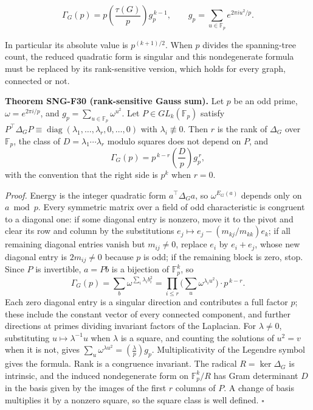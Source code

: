 \documentclass[
  11pt,
  a4paper,
]{report}
\begin{document}
\[
\Gamma_G(p)=p\left(\frac{\tau(G)}p\right)g_p^{\,k-1},
\qquad
g_p=\sum_{u\in\mathbb F_p}e^{2\pi i u^2/p}.
\tag{SNG-I022}
\]

In particular its absolute value is \(p^{(k+1)/2}\). When \(p\) divides
the spanning-tree count, the reduced quadratic form is singular and this
nondegenerate formula must be replaced by its rank-sensitive version,
which holds for every graph, connected or not.

\textbf{Theorem SNG-F30 (rank-sensitive Gauss sum).} Let \(p\) be an odd
prime, \(\omega=e^{2\pi i/p}\), and
\(g_p=\sum_{u\in\mathbb F_p}\omega^{u^2}\). Let
\(P\in GL_k(\mathbb F_p)\) satisfy
\(P^{\top}\Delta_GP\equiv\operatorname{diag}(\lambda_1,\ldots,\lambda_r,0,\ldots,0)\)
with \(\lambda_i\not\equiv0\). Then \(r\) is the rank of \(\Delta_G\)
over \(\mathbb F_p\), the class of \(D=\lambda_1\cdots\lambda_r\) modulo
squares does not depend on \(P\), and \[
\Gamma_G(p)=p^{\,k-r}\left(\frac Dp\right)g_p^{\,r},
\] with the convention that the right side is \(p^k\) when \(r=0\).

\emph{Proof.} Energy is the integer quadratic form \(a^\top\Delta_Ga\),
so \(\omega^{E_G(a)}\) depends only on \(a\bmod p\). Every symmetric
matrix over a field of odd characteristic is congruent to a diagonal
one: if some diagonal entry is nonzero, move it to the pivot and clear
its row and column by the substitutions
\(e_j\mapsto e_j-(m_{kj}/m_{kk})e_k\); if all remaining diagonal entries
vanish but \(m_{ij}\ne0\), replace \(e_i\) by \(e_i+e_j\), whose new
diagonal entry is \(2m_{ij}\ne0\) because \(p\) is odd; if the remaining
block is zero, stop. Since \(P\) is invertible, \(a=Pb\) is a bijection
of \(\mathbb F_p^k\), so \[
\Gamma_G(p)=\sum_b\omega^{\sum_i\lambda_ib_i^2}=\prod_{i\le r}\bigl(\sum_{u}\omega^{\lambda_iu^2}\bigr)\cdot p^{\,k-r}.
\] Each zero diagonal entry is a singular direction and contributes a
full factor \(p\); these include the constant vector of every connected
component, and further directions at primes dividing invariant factors
of the Laplacian. For \(\lambda\ne0\), substituting
\(u\mapsto\lambda^{-1}u\) when \(\lambda\) is a square, and counting the
solutions of \(u^2=v\) when it is not, gives
\(\sum_u\omega^{\lambda u^2}=\left(\frac\lambda p\right)g_p\).
Multiplicativity of the Legendre symbol gives the formula. Rank is a
congruence invariant. The radical \(R=\ker\Delta_G\) is intrinsic, and
the induced nondegenerate form on \(\mathbb F_p^k/R\) has Gram
determinant \(D\) in the basis given by the images of the first \(r\)
columns of \(P\). A change of basis multiplies it by a nonzero square,
so the square class is well defined. \(\square\)
\end{document}
